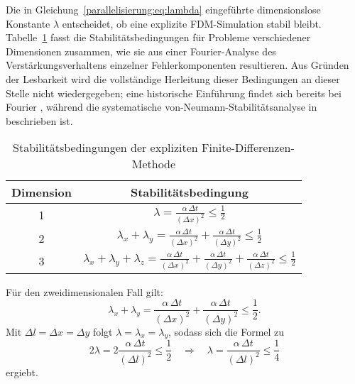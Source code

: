 Die in Gleichung~\eqref{parallelisierung:eq:lambda} eingeführte dimensionslose Konstante \(\lambda\) entscheidet, 
ob eine explizite FDM-Simulation stabil bleibt.  
Tabelle~\ref{parallelisierung:tab:stabilitaet_fdm} fasst die Stabilitätsbedingungen für Probleme verschiedener 
Dimensionen zusammen, wie sie aus einer Fourier-Analyse des Verstärkungsverhaltens einzelner Fehlerkomponenten 
resultieren.  
Aus Gründen der Lesbarkeit wird die vollständige Herleitung dieser Bedingungen an dieser Stelle nicht wiedergegeben; 
eine historische Einführung findet sich bereits bei Fourier \cite{Fourier1822}, während die systematische 
von-Neumann-Stabilitätsanalyse in \cite{VonNeumann1950} beschrieben ist.

\label{parallelisierung:sec:stabilitaetskriterien}

\begin{table}
	\centering
	\caption{Stabilitätsbedingungen der expliziten Finite-Differenzen-Methode}
	\label{parallelisierung:tab:stabilitaet_fdm}
	\begin{tabular}{|c|c|}
		\hline
		\textbf{Dimension} & \textbf{Stabilitätsbedingung} \\
		\hline
		1 & 
		\( \displaystyle \lambda = \frac{\alpha \, \Delta t}{(\Delta x)^2} \leq \frac{1}{2} \) \\
		\hline
		2 & 
		\( \displaystyle \lambda_x + \lambda_y =
		\frac{\alpha \, \Delta t}{(\Delta x)^2} +
		\frac{\alpha \, \Delta t}{(\Delta y)^2} \leq \frac{1}{2} \) \\
		\hline
		3 & 
		\( \displaystyle \lambda_x + \lambda_y + \lambda_z =
		\frac{\alpha \, \Delta t}{(\Delta x)^2} +
		\frac{\alpha \, \Delta t}{(\Delta y)^2} +
		\frac{\alpha \, \Delta t}{(\Delta z)^2} \leq \frac{1}{2} \) \\
		\hline
	\end{tabular}
\end{table}



Für den zweidimensionalen Fall gilt:
\begin{equation}
	\lambda_x + \lambda_y =
	\frac{\alpha \, \Delta t}{(\Delta x)^2} +
	\frac{\alpha \, \Delta t}{(\Delta y)^2} \leq \frac{1}{2}.
\end{equation}
Mit \(\Delta l = \Delta x = \Delta y\) folgt \(\lambda = \lambda_x = \lambda_y\), sodass sich die Formel zu
\begin{equation}
	2\lambda = 2 \frac{\alpha \, \Delta t}{(\Delta l)^2} \leq \frac{1}{2}
	\quad \Rightarrow \quad
	\lambda = \frac{\alpha \, \Delta t}{(\Delta l)^2} \leq \frac{1}{4}
\end{equation}
ergiebt.

